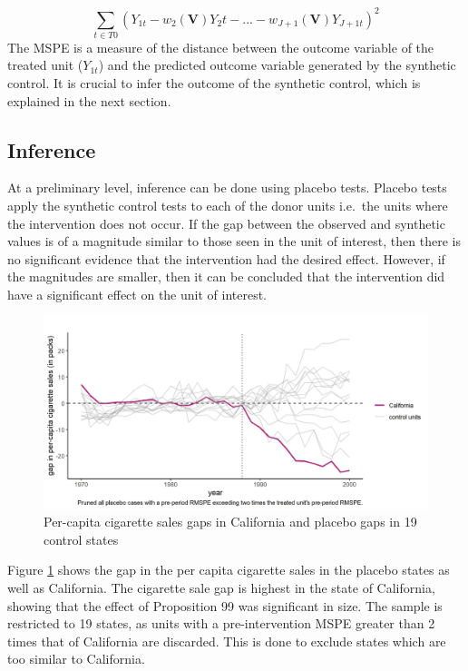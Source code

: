 \documentclass[12pt,nobind, a4paper]{reedthesis}
\begin{document}
 \[ \sum_{t \in T0}(Y_{1t}- w_{2}(\mathbf{V})Y_2{t}-...-w_{J+1}(\mathbf{V})Y_{J+1t})^2\]
 The MSPE is a measure of the distance between the outcome variable of the treated unit (\(Y_{1t}\)) and the predicted outcome variable generated by the synthetic control. It is crucial to infer the outcome of the synthetic control, which is explained in the next section.

 \hypertarget{inference}{%
 \subsection{Inference}\label{inference}}

 At a preliminary level, inference can be done using placebo tests. Placebo tests apply the synthetic control tests to each of the donor units i.e.~the units where the intervention does not occur. If the gap between the observed and synthetic values is of a magnitude similar to those seen in the unit of interest, then there is no significant evidence that the intervention had the desired effect. However, if the magnitudes are smaller, then it can be concluded that the intervention did have a significant effect on the unit of interest.
 \begin{figure}

 {\centering \includegraphics[width=1\linewidth]{figure/calplacebo} 

 }

 \caption{Per-capita cigarette sales gaps in California and placebo gaps in 19 control states}\label{fig:placebo}
 \end{figure}
 Figure \ref{fig:placebo} shows the gap in the per capita cigarette sales in the placebo states as well as California. The cigarette sale gap is highest in the state of California, showing that the effect of Proposition 99 was significant in size. The sample is restricted to 19 states, as units with a pre-intervention MSPE greater than 2 times that of California are discarded. This is done to exclude states which are too similar to California.
 \linebreak
\end{document}
